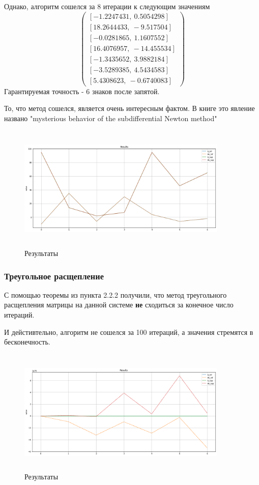 \documentclass{article}
\begin{document}
    Однако, алгоритм сошелся за 8 итерации к следующим значениям 
    \begin{equation*}
        \begin{pmatrix}
             [ -1.2247431, \ 0.5054298] \\
             [ 18.2644433, \  -9.517504] \\
             [ -0.0281865, \ 1.1607552] \\
             [ 16.4076957, \ -14.455534] \\
             [ -1.3435652, \ 3.9882184] \\
             [ -3.5289385, \ 4.5434583] \\
             [  5.4308623, \ -0.6740083]
        \end{pmatrix}
    \end{equation*}
    Гарантируемая точность - 6 знаков после запятой.
    
    То, что метод сошелся, является очень интересным фактом. В книге \cite{litlink3} это явление названо "mysterious behavior of the subdifferential Newton method"
     \begin{figure}[H]
        \centering
        \includegraphics[width=10cm, height=6cm]{1.png}
        \caption{Результаты}
    \end{figure}
    
    
    \subsubsection{Треугольное расщепление}
    С помощью теоремы из пункта 2.2.2 получили, что метод треугольного расщепления матрицы на данной системе \textbf{не} сходиться за конечное число итераций.
    
    И дейстивтельно, алгоритм не сошелся за 100 итераций, а значения стремятся в бесконечность.
    \begin{figure}[H]
        \centering
        \includegraphics[width=10cm, height=6cm]{2.png}
        \caption{Результаты}
    \end{figure}
    
\end{document}
